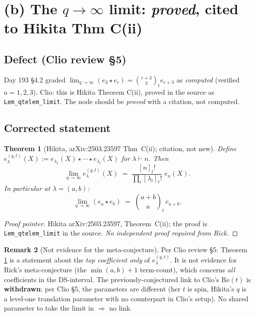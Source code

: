 \documentclass[11pt]{article}
\newtheorem{theorem}{Theorem}
\theoremstyle{definition}
\newtheorem{remark}[theorem]{Remark}
\newcommand{\qi}[1]{[#1]_t}
\begin{document}
\section{(b) The $q\to\infty$ limit: \emph{proved}, cited to Hikita Thm C(ii)}
\label{sec:qinfty}

\subsection*{Defect (Clio review \S 5)}
Day 193 \S 4.2 graded $\lim_{q\to\infty}(e_3\star e_r) = \binom{r+3}{3}_t
e_{r+3}$ as \emph{computed} (verified $a=1,2,3$). Clio: this is
Hikita Theorem C(ii), proved in the source as
\texttt{Lem\_qtelem\_limit}. The node should be \emph{proved}
with a citation, not computed.

\subsection*{Corrected statement}
\begin{theorem}[Hikita, arXiv:2503.23597 Thm~C(ii); citation, not new]
\label{thm:qinfty}
Define $e_\lambda^{(q,t)}(X):=e_{\lambda_1}(X)\star\cdots\star e_{\lambda_l}(X)$
for $\lambda \vdash n$. Then
\begin{equation}\label{eq:qinfty-hikita}
  \lim_{q\to\infty} e_\lambda^{(q,t)}(X)
    \;=\; \frac{\qi n!}{\prod_i \qi{\lambda_i}!}\; e_n(X).
\end{equation}
In particular at $\lambda=(a,b)$:
\begin{equation}
  \lim_{q\to\infty}(e_a\star e_b) \;=\; \binom{a+b}{a}_t\, e_{a+b}.
\end{equation}
\end{theorem}

\begin{proof}[Proof pointer]
Hikita arXiv:2503.23597, Theorem~C(ii); the proof is
\texttt{Lem\_qtelem\_limit} in the source. \emph{No independent proof
required from Rick.}
\end{proof}

\begin{remark}[Not evidence for the meta-conjecture]
Per Clio review \S 5: Theorem \ref{thm:qinfty} is a statement about
the \emph{top coefficient only} of $e_\lambda^{(q,t)}$. It is not
evidence for Rick's meta-conjecture (the $\min(a,b)+1$ term-count),
which concerns \emph{all} coefficients in the DS-interval. The
previously-conjectured link to Clio's $\mathrm{Re}(t)$ is
\textbf{withdrawn}: per Clio \S 5, the parameters are different
(her $t$ is spin, Hikita's $q$ is a level-one translation parameter
with no counterpart in Clio's setup). No shared parameter to take
the limit in $\Longrightarrow$ no link.
\end{remark}
\end{document}
